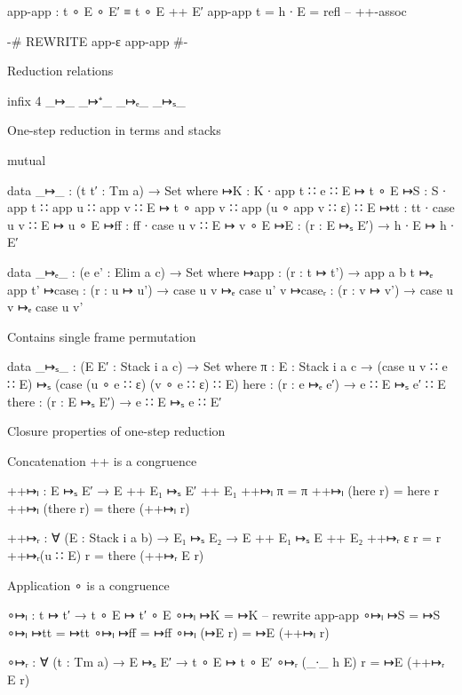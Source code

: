 \begin{code}
app-app : t ∘ E ∘ E′ ≡ t ∘ E ++ E′
app-app {t = h ∙ E} = refl  -- ++-assoc

{-# REWRITE app-ε app-app #-}
\end{code}


Reduction relations

\begin{code}
infix 4 _↦_ _↦⁺_ _↦ₑ_ _↦ₛ_
\end{code}

One-step reduction in terms and stacks

\begin{code}
mutual

  data _↦_ : (t t′ : Tm a) → Set where
    ↦K   : K   ∙ app t ∷ e              ∷ E ↦ t  ∘ E
    ↦S   : S   ∙ app t ∷ app u ∷ app v  ∷ E ↦ t  ∘ app v ∷ app (u ∘ app v ∷ ε) ∷ E
    ↦tt  : tt  ∙ case u v               ∷ E ↦ u  ∘ E
    ↦ff  : ff  ∙ case u v               ∷ E ↦ v  ∘ E
    ↦E   : (r : E ↦ₛ E′) → h ∙ E ↦ h ∙ E′

  data _↦ₑ_ : (e e' : Elim a c) → Set where
    ↦app    : (r : t ↦ t')  → app {a} {b} t  ↦ₑ app t'
    ↦caseₗ  : (r : u ↦ u')  → case u v       ↦ₑ case u' v
    ↦caseᵣ  : (r : v ↦ v')  → case u v       ↦ₑ case u v'
\end{code}

  Contains single frame permutation

\begin{code}
  data _↦ₛ_ : (E E′ : Stack i a c) → Set where
    π      : {E : Stack i a c} → (case u v ∷ e ∷ E) ↦ₛ (case (u ∘ e ∷ ε) (v ∘ e ∷ ε) ∷ E)
    here   : (r : e ↦ₑ e′)  → e ∷ E ↦ₛ e′ ∷ E
    there  : (r : E ↦ₛ E′)  → e ∷ E ↦ₛ e  ∷ E′
\end{code}

Closure properties of one-step reduction

Concatenation ++ is a congruence

\begin{code}
++↦ₗ : E ↦ₛ E′ → E ++ E₁ ↦ₛ E′ ++ E₁
++↦ₗ π          = π
++↦ₗ (here  r)  = here r
++↦ₗ (there r)  = there (++↦ₗ r)

++↦ᵣ : ∀ (E : Stack i a b) → E₁ ↦ₛ E₂ → E ++ E₁ ↦ₛ E ++ E₂
++↦ᵣ ε       r = r
++↦ᵣ(u ∷ E)  r = there (++↦ᵣ E r)
\end{code}

Application ∘ is a congruence

\begin{code}
∘↦ₗ : t ↦ t′ → t ∘ E ↦ t′ ∘ E
∘↦ₗ ↦K      = ↦K  -- rewrite app-app
∘↦ₗ ↦S      = ↦S
∘↦ₗ ↦tt     = ↦tt
∘↦ₗ ↦ff     = ↦ff
∘↦ₗ (↦E r)  = ↦E (++↦ₗ r)

∘↦ᵣ : ∀ (t : Tm a) → E ↦ₛ E′ → t ∘ E ↦ t ∘ E′
∘↦ᵣ (_∙_ h E) r = ↦E (++↦ᵣ E r)
\end{code}

